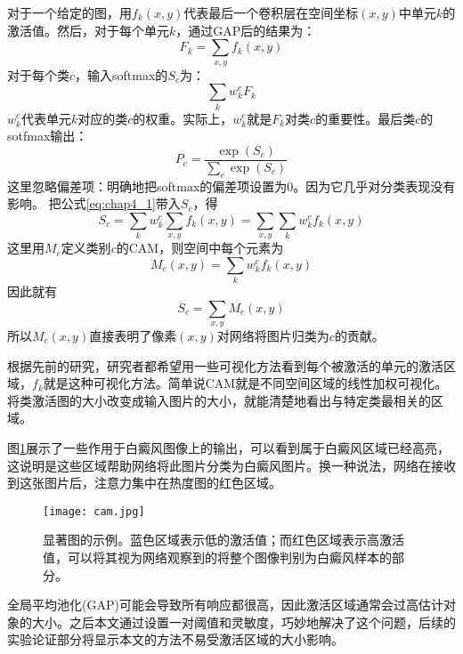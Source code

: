 对于一个给定的图，用$f_k(x, y)$代表最后一个卷积层在空间坐标$(x,y)$中单元$k$的激活值。然后，对于每个单元$k$，通过GAP后的结果为：
\begin{equation}
\label{eq:chap4_1}
F_k=\sum_{x, y} f_{k}(x, y)
\end{equation}
对于每个类$c$，输入softmax的$S_c$为：
\begin{equation}
\label{eq:}
\sum_{k} w_{k}^{c} F_{k}
\end{equation}
$w_k^c$代表单元$k$对应的类$c$的权重。实际上，$w_k^c$就是$F_k$对类$c$的重要性。最后类$c$的sotfmax输出：
\begin{equation}
\label{eq:}
P_c=\frac{\exp \left(S_{c}\right)}{\sum_{c} \exp \left(S_{c}\right)}
\end{equation}
这里忽略偏差项：明确地把softmax的偏差项设置为0。因为它几乎对分类表现没有影响。
把公式\ref{eq:chap4_1}带入$S_c$，得
\begin{equation}
\label{eq:}
S_{c}=\sum_{k} w_{k}^{c} \sum_{x, y} f_{k}(x, y)=\sum_{x, y} \sum_{k} w_{k}^{c} f_{k}(x, y)
\end{equation}
这里用$M_c$定义类别$c$的CAM，则空间中每个元素为
\begin{equation}
\label{eq:}
M_{c}(x, y)=\sum_{k} w_{k}^{c} f_{k}(x, y)
\end{equation}
因此就有
\begin{equation}
\label{eq:}
S_{c}=\sum_{x, y} M_{c}(x, y)
\end{equation}
所以$M_c(x,y)$直接表明了像素$(x,y)$对网络将图片归类为$c$的贡献。

根据先前的研究\cite{zeiler2014visualizing}，研究者都希望用一些可视化方法看到每个被激活的单元的激活区域，$f_k$就是这种可视化方法。简单说CAM就是不同空间区域的线性加权可视化。将类激活图的大小改变成输入图片的大小，就能清楚地看出与特定类最相关的区域。

图\ref{fig:cam}展示了一些作用于白癜风图像上的输出，可以看到属于白癜风区域已经高亮，这说明是这些区域帮助网络将此图片分类为白癜风图片。换一种说法，网络在接收到这张图片后，注意力集中在热度图的红色区域。
\begin{figure}[htbp]
\begin{center}
\texttt{[image: cam.jpg]}
\end{center}
\caption{显著图的示例。蓝色区域表示低的激活值；而红色区域表示高激活值，可以将其视为网络观察到的将整个图像判别为白癜风样本的部分。}
\label{fig:cam}
\end{figure}

全局平均池化(GAP)可能会导致所有响应都很高，因此激活区域通常会过高估计对象的大小\cite{Kolesnikov:2016tf,Zhou:2018ul}。之后本文通过设置一对阈值和灵敏度，巧妙地解决了这个问题，后续的实验论证部分将显示本文的方法不易受激活区域的大小影响。

